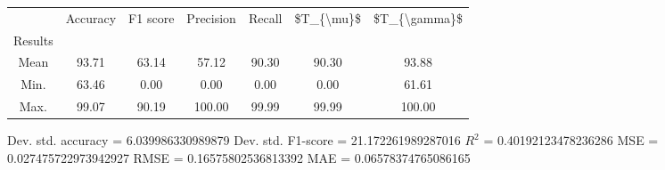 \begin{tabular}{|c|c|c|c|c|c|c|}
\toprule
{} &  Accuracy &  F1 score &  Precision &  Recall &  \$T\_\{\textbackslash mu\}\$ &  \$T\_\{\textbackslash gamma\}\$ \\
Results &           &           &            &         &            &               \\
\hline
Mean    &     93.71 &     63.14 &      57.12 &   90.30 &      90.30 &         93.88 \\
Min.    &     63.46 &      0.00 &       0.00 &    0.00 &       0.00 &         61.61 \\
Max.    &     99.07 &     90.19 &     100.00 &   99.99 &      99.99 &        100.00 \\
\bottomrule
\end{tabular}

 Dev. std. accuracy = 6.039986330989879
 Dev. std. F1-score = 21.172261989287016
 $R^2$ = 0.40192123478236286
 MSE = 0.027475722973942927
 RMSE = 0.16575802536813392
 MAE = 0.06578374765086165